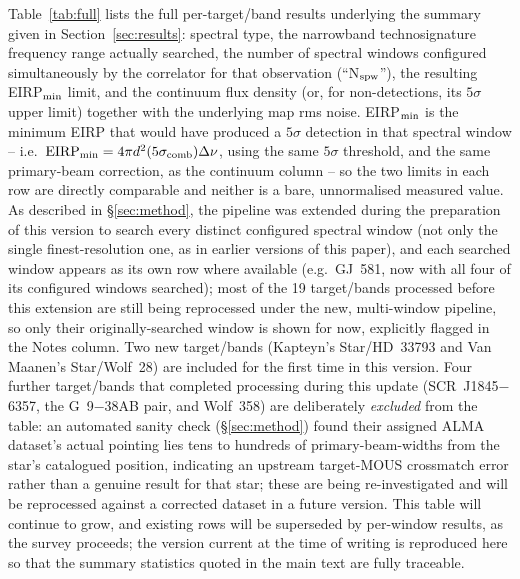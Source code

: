 \documentclass{openjournal}
\begin{document}
Table~\ref{tab:full} lists the full per-target/band results underlying the
summary given in Section~\ref{sec:results}: spectral type, the narrowband
technosignature frequency range actually searched, the number of spectral
windows configured simultaneously by the correlator for that observation
(``N$_{\rm spw}$''), the resulting EIRP$_{\rm min}$ limit, and the
continuum flux density (or, for non-detections, its $5\sigma$ upper
limit) together with the underlying map rms noise. EIRP$_{\rm min}$ is
the minimum EIRP that would have produced a $5\sigma$ detection in that
spectral window -- i.e.\ $\mathrm{EIRP_{min}} = 4\pi d^{2}(5\sigma_{\rm
comb})\Delta\nu$, using the same $5\sigma$ threshold, and the same
primary-beam correction, as the continuum column -- so the two limits in
each row are directly comparable and neither is a bare, unnormalised
measured value. As described in \S\ref{sec:method}, the pipeline was
extended during the preparation of this version to search every distinct
configured spectral window (not only the single finest-resolution one, as
in earlier versions of this paper), and each searched window appears as
its own row where available (e.g.\ GJ~581, now with all four of its
configured windows searched); most of the 19 target/bands processed
before this extension are still being reprocessed under the new,
multi-window pipeline, so only their originally-searched window is shown
for now, explicitly flagged in the Notes column. Two new target/bands
(Kapteyn's Star/HD~33793 and Van Maanen's Star/Wolf~28) are included for
the first time in this version. Four further target/bands that completed
processing during this update (SCR~J1845$-$6357, the G~9$-$38AB pair, and
Wolf~358) are deliberately \emph{excluded} from the table: an automated
sanity check (\S\ref{sec:method}) found their assigned ALMA dataset's
actual pointing lies tens to hundreds of primary-beam-widths from the
star's catalogued position, indicating an upstream target-MOUS
crossmatch error rather than a genuine result for that star; these are
being re-investigated and will be reprocessed against a corrected
dataset in a future version. This table will continue to grow, and
existing rows will be superseded by per-window results, as the survey
proceeds; the version current at the time of writing is reproduced here
so that the summary statistics quoted in the main text are fully
traceable.
\end{document}
